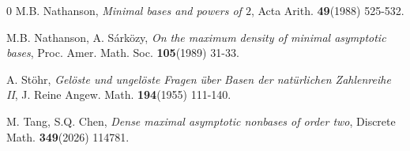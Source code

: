 \documentclass[reqno,12pt,twoside]{article}
\numberwithin{equation}{section}
\begin{document}
\begin{thebibliography}{0}
 M.B. Nathanson, {\it Minimal bases and powers of $2$}, Acta Arith. {\bf 49}(1988) 525-532.

 M.B. Nathanson, A. S\'{a}rk\"ozy, {\it On the maximum density of minimal asymptotic bases}, Proc. Amer. Math. Soc. {\bf 105}(1989) 31-33.

 A. St\"{o}hr, {\it Gel\"{o}ste und ungel\"{o}ste Fragen \"{u}ber Basen der nat\"{u}rlichen Zahlenreihe II}, J. Reine Angew. Math. {\bf 194}(1955) 111-140.

 M. Tang, S.Q. Chen, {\it Dense maximal asymptotic nonbases of order two}, Discrete Math. {\bf 349}(2026) 114781.

\end{thebibliography}
\end{document}
